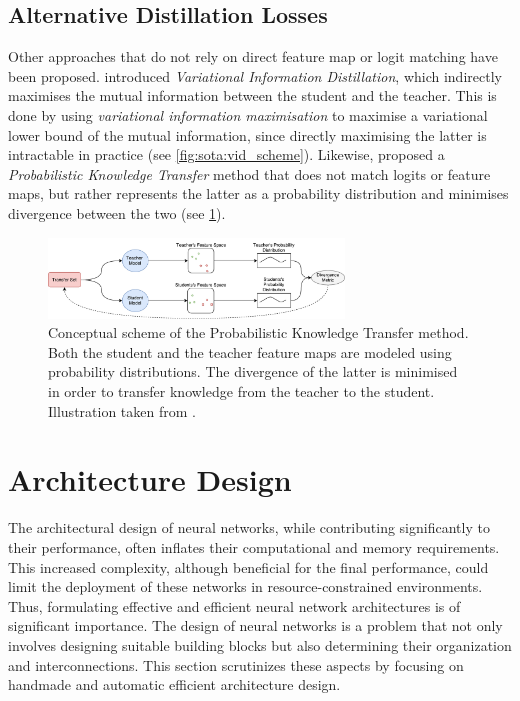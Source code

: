 \subsection{Alternative Distillation Losses}
Other approaches that do not rely on direct feature map or logit matching have
been proposed. \cite{DBLP:conf/cvpr/AhnHDLD19} introduced \emph{Variational
  Information Distillation}, which indirectly maximises the mutual information
between the student and the teacher. This is done by using \emph{variational
  information maximisation} \cite{barber2004algorithm} to maximise a variational
lower bound of the mutual information, since directly maximising the latter is
intractable in practice (see \cref{fig:sota:vid_scheme}). Likewise,
\cite{DBLP:conf/eccv/PassalisT18} proposed a \emph{Probabilistic Knowledge
  Transfer} method that does not match logits or feature maps, but rather
represents the latter as a probability distribution and minimises divergence
between the two (see \cref{fig:sota:pkt_scheme}).\\


\begin{figure}[htbp]
  \centering
  \includegraphics[width=0.7\textwidth]{chapter_sota/assets/pkt_diagram.pdf}
  \caption{Conceptual scheme of the Probabilistic Knowledge Transfer method.
    Both the student and the teacher feature maps are modeled using probability
    distributions. The divergence of the latter is minimised in order to
    transfer knowledge from the teacher to the student. Illustration taken from
    \cite{DBLP:conf/eccv/PassalisT18}.}
  \label{fig:sota:pkt_scheme}
\end{figure}

\section{Architecture Design}\label{sec:sota:archi_design}

The architectural design of neural networks, while contributing significantly to
their performance, often inflates their computational and memory requirements.
This increased complexity, although beneficial for the final performance, could
limit the deployment of these networks in resource-constrained environments.
Thus, formulating effective and efficient neural network architectures is of
significant importance. The design of neural networks is a problem that not only
involves designing suitable building blocks but also determining their
organization and interconnections. This section scrutinizes these aspects by
focusing on handmade and automatic efficient architecture design.\\

